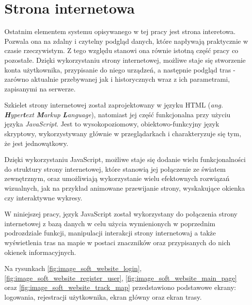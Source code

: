 \section{Strona internetowa}
\lstset{language=HTML, inputencoding=utf8, breaklines=true}

Ostatnim elementem systemu opisywanego w tej pracy jest strona interetowa. Pozwala ona na zdalny i czytelny podgląd danych, które napływają praktycznie w czasie rzeczywistym. Z tego względu stanowi ona równie istotną część pracy co pozostałe. Dzięki wykorzystaniu strony internetowej, możliwe staje się stworzenie konta użytkownika, przypisanie do niego urządzeń, a następnie podgląd tras - zarówno aktualnie przebywanej jak i historycznych wraz z ich parametrami, zapisanymi na serwerze.

Szkielet strony internetowej został zaprojektowany w języku HTML (\textit{ang. \textbf{H}yper\textbf{t}ext \textbf{M}arkup \textbf{L}anguage}), natomiast jej część funkcjonalna przy użyciu języka \textit{JavaScript}. Jest to wysokopoziomowy, obiektowo-funkcyjny język skryptowy, wykorzystywany głównie w przeglądarkach i charakteryzuje się tym, że jest jednowątkowy.

Dzięki wykorzystaniu JavaScript, możliwe staje się dodanie wielu funkcjonalności do struktury strony internetowej, które stanowią jej połączenie ze światem zewnętrznym, oraz umożliwiają wykorzystanie wielu efektownych rozwiązań wizualnych, jak na przykład animowane przewijanie strony, wyskakujące okienka czy interaktywne wykresy.

W niniejszej pracy, język JavaScript został wykorzystany do połączenia strony internetowej z bazą danych w celu użycia wymienionych w poprzednim podrozdziale funkcji, manipulacji interakcji strony internetowaj a także wyświetlenia tras na mapie w postaci znaczników oraz przypisanych do nich okienek informacyjnych.  

Na rysunkach \ref{fig:image_soft_website_login}, \ref{fig:image_soft_website_register_user}, \ref{fig:image_soft_website_main_page} oraz \ref{fig:image_soft_website_track_map} przedstawiono podstawowe ekrany: logowania, rejestracji użytkownika, ekran główny oraz ekran trasy.


